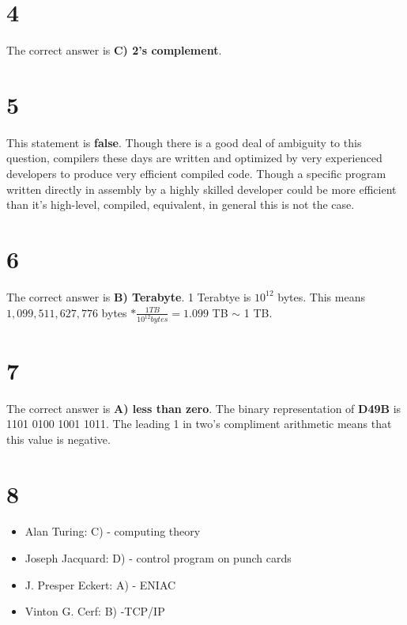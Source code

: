 \documentclass[a4paper,11pt]{article}
\begin{document}

\section*{4}
The correct answer is {\bf C) 2's complement}.   


\section*{5}
This statement is {\bf false}.  Though there is a good deal of ambiguity to this question, compilers these days are written and optimized by very experienced developers to produce very efficient compiled code.  Though a specific program written directly in assembly by a highly skilled developer could be more efficient than it's high-level, compiled, equivalent, in general this is not the case.


\section*{6}

The correct answer is {\bf  B) Terabyte}.  1 Terabtye is $10^{12}$ bytes.  This means $1,099,511,627,776$ bytes $* \frac{1 TB}{10^{12}  bytes} = 1.099$ TB $\sim$ 1 TB.


\section*{7}
The correct answer is {\bf A) less than zero}.  The binary representation of {\bf D49B} is 1101 0100 1001 1011.  The leading 1 in two's compliment arithmetic means that this value is negative.



\section*{8}
\begin{itemize}
    \item Alan Turing: C) - computing theory
    \item Joseph Jacquard: D) - control program on punch cards
    \item J. Presper Eckert:  A) - ENIAC
    \item Vinton G. Cerf: B) -TCP/IP
\end{itemize}
\end{document}
